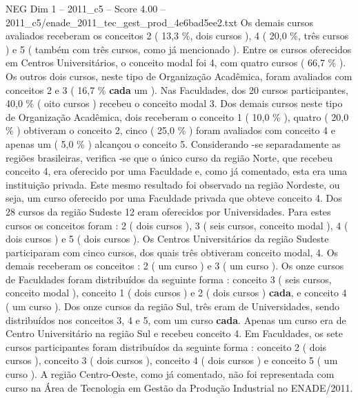 \begin{textsample}{NEG Dim 1 – 2011\_c5 – Score 4.00 – 2011\_c5/enade\_2011\_tec\_gest\_prod\_4e6bad5ee2.txt}
Os demais cursos avaliados receberam os conceitos 2 ( 13,3 \%, dois cursos ), 4 ( 20,0 \%, três cursos ) e 5 ( também com três cursos, como já mencionado ).
Entre os cursos oferecidos em Centros Universitários, o conceito modal foi 4, com quatro cursos ( 66,7 \% ).
Os outros dois cursos, neste tipo de Organização Acadêmica, foram avaliados com conceitos 2 e 3 ( 16,7 \% \textbf{cada} um ).
Nas Faculdades, dos 20 cursos participantes, 40,0 \% ( oito cursos ) recebeu o conceito modal 3.
Dos demais cursos neste tipo de Organização Acadêmica, dois receberam o conceito 1 ( 10,0 \% ), quatro ( 20,0 \% ) obtiveram o conceito 2, cinco ( 25,0 \% ) foram avaliados com conceito 4 e apenas um ( 5,0 \% ) alcançou o conceito 5.
Considerando -se separadamente as regiões brasileiras, verifica -se que o único curso da região Norte, que recebeu conceito 4, era oferecido por uma Faculdade e, como já comentado, esta era uma instituição privada.
Este mesmo resultado foi observado na região Nordeste, ou seja, um curso oferecido por uma Faculdade privada que obteve conceito 4.
Dos 28 cursos da região Sudeste 12 eram oferecidos por Universidades.
Para estes cursos os conceitos foram : 2 ( dois cursos ), 3 ( seis cursos, conceito modal ), 4 ( dois cursos ) e 5 ( dois cursos ).
Os Centros Universitários da região Sudeste participaram com cinco cursos, dos quais três obtiveram conceito modal, 4.
Os demais receberam os conceitos : 2 ( um curso ) e 3 ( um curso ).
Os onze cursos de Faculdades foram distribuídos da seguinte forma : conceito 3 ( seis cursos, conceito modal ), conceito 1 ( dois cursos ) e 2 ( dois cursos ) \textbf{cada}, e conceito 4 ( um curso ).
Dos onze cursos da região Sul, três eram de Universidades, sendo distribuídos nos conceitos 3, 4 e 5, com um curso \textbf{cada}.
Apenas um curso era de Centro Universitário na região Sul e recebeu conceito 4.
Em Faculdades, os sete cursos participantes foram distribuídos da seguinte forma : conceito 2 ( dois cursos ), conceito 3 ( dois cursos ), conceito 4 ( dois cursos ) e conceito 5 ( um curso ).
A região Centro-Oeste, como já comentado, não foi representada com curso na Área de Tecnologia em Gestão da Produção Industrial no ENADE/2011.

\end{textsample}
